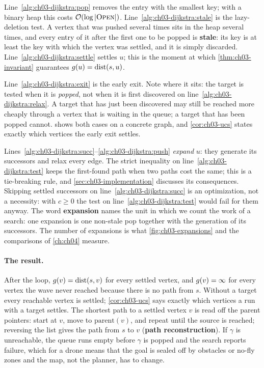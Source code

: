 Line~\ref{alg:ch03-dijkstra:pop} removes the entry with the smallest key; with a binary heap
this costs $\mathcal{O}\!\left(\log\left\lvert \text{\textsc{Open}} \right\rvert\right)$. Line~\ref{alg:ch03-dijkstra:stale} is the
lazy-deletion test. A vertex that was pushed several times sits in the heap several times, and
every entry of it after the first one to be popped is \textbf{stale}: its key
is at least the key with which the vertex was settled, and it is simply discarded.
Line~\ref{alg:ch03-dijkstra:settle} settles $u$; this is the moment at which
\cref{thm:ch03-invariant} guarantees $g(u)=\operatorname{dist}(s,u)$.

Line~\ref{alg:ch03-dijkstra:exit} is the early exit. Note
where it sits: the target is tested when it is \emph{popped}, not when it is first discovered on
line~\ref{alg:ch03-dijkstra:relax}. A target that has just been discovered may still be reached
more cheaply through a vertex that is waiting in the queue; a target that has been popped
cannot.  shows both cases on a concrete graph, and \cref{cor:ch03-ucs}
states exactly which vertices the early exit settles.

Lines~\ref{alg:ch03-dijkstra:succ}--\ref{alg:ch03-dijkstra:push} \emph{expand} $u$: they
generate its successors and relax every edge. The strict inequality on
line~\ref{alg:ch03-dijkstra:test} keeps the first-found path when two paths cost the same; this
is a tie-breaking rule, and \cref{sec:ch03-implementation} discusses its consequences. Skipping
settled successors on line~\ref{alg:ch03-dijkstra:succ} is an optimization, not a necessity:
with $c\ge0$ the test on line~\ref{alg:ch03-dijkstra:test} would fail for them anyway. The word
\textbf{expansion} names the unit in which we count the work of a search: one
expansion is one non-stale pop together with the generation of its successors. The number of
expansions is what \cref{fig:ch03-expansions} and the comparisons of \cref{ch:ch04} measure.

\paragraph{The result.} After the loop, $g(v)=\operatorname{dist}(s,v)$ for every settled vertex, and
$g(v)=\infty$ for every vertex the wave never reached because there is no path from $s$.
Without a target every reachable vertex is settled; \cref{cor:ch03-ucs} says exactly which
vertices a run with a target settles. The shortest path to a settled vertex $v$ is read off
the parent pointers: start at $v$, move to $\mathrm{parent}(v)$, and
repeat until the source is reached; reversing the list gives the path from $s$ to $v$
(\textbf{path reconstruction}). If $\gamma$ is unreachable, the queue runs
empty before $\gamma$ is popped and the search reports failure, which for a drone means that the goal
is sealed off by obstacles or no-fly zones and the map, not the planner, has to change.


